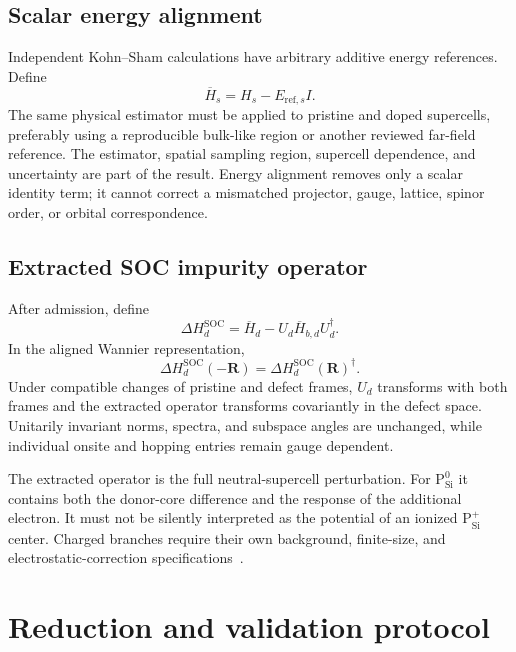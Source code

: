 \documentclass[11pt]{article}
\newenvironment{prospective}{\color{prospectivered}}{}
\begin{document}
\begin{prospective}
\subsection{Scalar energy alignment}
Independent Kohn--Sham calculations have arbitrary additive energy references. Define
\begin{equation}
 \overline H_s=H_s-E_{\mathrm{ref},s}I.
\end{equation}
The same physical estimator must be applied to pristine and doped supercells, preferably
using a reproducible bulk-like region or another reviewed far-field reference. The
estimator, spatial sampling region, supercell dependence, and uncertainty are part of the
result. Energy alignment removes only a scalar identity term; it cannot correct a
mismatched projector, gauge, lattice, spinor order, or orbital correspondence.

\subsection{Extracted SOC impurity operator}
After admission, define
\begin{equation}
 \boxed{
 \Delta H_d^{\mathrm{SOC}}
 =\overline H_d-U_d\overline H_{b,d}U_d^\dagger
 }.
 \label{eq:impurity}
\end{equation}
In the aligned Wannier representation,
\begin{equation}
 \Delta H_d^{\mathrm{SOC}}(-\mathbf R)
 =\Delta H_d^{\mathrm{SOC}}(\mathbf R)^\dagger.
\end{equation}
Under compatible changes of pristine and defect frames, $U_d$ transforms with both
frames and the extracted operator transforms covariantly in the defect space. Unitarily
invariant norms, spectra, and subspace angles are unchanged, while individual onsite and
hopping entries remain gauge dependent.

The extracted operator is the full neutral-supercell perturbation. For
$\mathrm P_{\mathrm{Si}}^0$ it contains both the donor-core difference and the response
of the additional electron. It must not be silently interpreted as the potential of an
ionized $\mathrm P_{\mathrm{Si}}^+$ center. Charged branches require their own background,
finite-size, and electrostatic-correction specifications~\cite{freysoldt2014}.

\section{Reduction and validation protocol}


\end{prospective}
\end{document}
